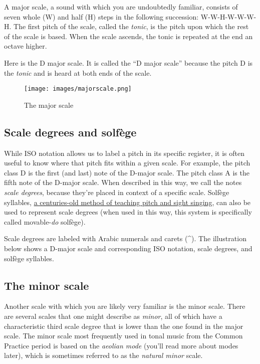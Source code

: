 \documentclass{book}
\begin{document}
A major scale, a sound with which you are undoubtedly familiar, consists of
seven whole (W) and half (H) steps in the following succession: W-W-H-W-W-W-H.
The first pitch of the scale, called the \emph{tonic}, is the pitch upon which
the rest of the scale is based. When the scale ascends, the tonic is repeated
at the end an octave higher.

Here is the D major scale. It is called the ``D major scale'' because the
pitch D is the \emph{tonic} and is heard at both ends of the scale.

\begin{figure}
\centering
\texttt{[image: images/majorscale.png]}
\caption{The major scale}
\end{figure}

\hypertarget{scale-degrees-and-solfuxe8ge}{%
\subsection{Scale degrees and solfège}\label{scale-degrees-and-solfuxe8ge}}

While ISO notation allows us to label a pitch in its specific register, it is
often useful to know where that pitch fits within a given scale. For example,
the pitch class D is the first (and last) note of the D-major scale. The pitch
class A is the fifth note of the D-major scale. When described in this way, we
call the notes \emph{scale degrees}, because they're placed in context of a
specific scale. Solfège syllables,
\href{http://en.wikipedia.org/wiki/Solfège}{a centuries-old method of teaching
pitch and sight singing}, can also be used to represent scale degrees (when
used in this way, this system is specifically called movable-\emph{do}
solfège).

Scale degrees are labeled with Arabic numerals and carets (\^{}). The
illustration below shows a D-major scale and corresponding ISO notation, scale
degrees, and solfège syllables.

\hypertarget{the-minor-scale}{%
\subsection{The minor scale}\label{the-minor-scale}}

Another scale with which you are likely very familiar is the minor scale.
There are several scales that one might describe as \emph{minor}, all of which
have a characteristic third scale degree that is lower than the one found in
the major scale. The minor scale most frequently used in tonal music from the
Common Practice period is based on the \emph{aeolian mode} (you'll read more
about modes later), which is sometimes referred to as the \emph{natural minor}
scale.
\end{document}
